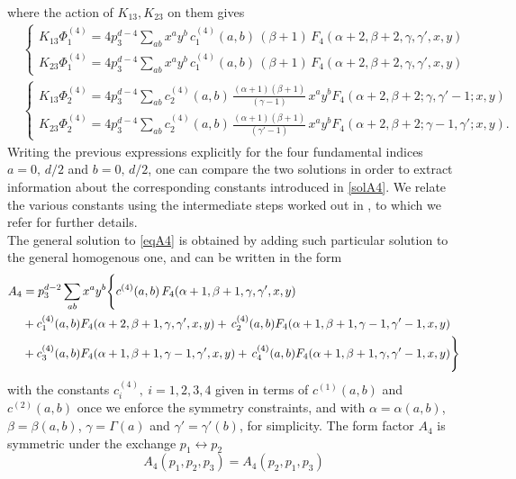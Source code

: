 \documentclass[a4paper,11pt,openright,twoside]{book}
\let\a=\alpha   \let\b=\beta   \let\g=\gamma   \let\d=\delta
\numberwithin{equation}{section}
\begin{document}
{{\begin{equation}
\begin{split}
\end{split}\label{solA4}
\end{equation}
where the action of $K_{13}, K_{23}$ on them gives
\begin{align}
&\left\{\begin{matrix}
	K_{13}\Phi_1^{(4)}=4p_3^{d-4}\sum_{a b} x^a y^b\, c_1^{(4)}(a,b)\,(\b+1)\,F_4(\alpha+2,\beta+2,\gamma,\gamma',x,y)\\[1.5ex]
	K_{23}\Phi_1^{(4)}=4p_3^{d-4}\sum_{a b} x^a y^b\, c_1^{(4)}(a,b)\,(\b+1)\,F_4(\alpha+2,\beta+2,\gamma,\gamma',x,y)
\end{matrix}\right.\\[2.2ex]
&\left\{\begin{matrix}
	K_{13}\Phi_2^{(4)}=4p_3^{d -4} \sum_{a b} c_2^{(4)}(a,b)\,\frac{(\a+1)(\b+1)}{(\g-1)} \,x^a y^b   F_4(\alpha+2,\beta+2; \gamma,\gamma'-1;x,y)\\[1.5ex]
	K_{23}\Phi_2^{(4)}=4p_3^{d -4} \sum_{a b} c_2^{(4)}(a,b)\,\frac{(\a+1)(\b+1)}{(\g'-1)} \,x^a y^b   F_4(\alpha+2,\beta+2; \gamma-1,\gamma';x,y).
\end{matrix}\right.
\end{align}
Writing the previous expressions explicitly for the four fundamental indices $a=0,\,d/2$ and $b=0,\,d/2$, one can compare the two solutions in order to extract information about the corresponding constants introduced in \eqref{solA4}.  
We relate the various constants using the intermediate steps worked out in \cite{Coriano:2018bbe, Coriano:2018bsy}, to which we refer for further details.\\ 
The general solution to \eqref{eqA4} is obtained by adding such particular solution to the general homogenous one, and can be written in the form
\begin{align}
A_4&=p_3^{d-2}\sum_{ab}x^ay^b\Bigg\{c^{(4)}(a,b)\,F_4(\a+1,\b+1,\g,\g',x,y)\notag\\
&+c^{(4)}_1(a,b)F_4(\a+2,\b+1,\g,\g',x,y)+\,c^{(4)}_2(a,b)F_4(\a+1,\b+1,\g-1,\g'-1,x,y)\notag\\
&+c^{(4)}_3(a,b)F_4(\a+1,\b+1,\g-1,\g',x,y)+\,c^{(4)}_4(a,b)F_4(\a+1,\b+1,\g,\g'-1,x,y)\Bigg\}
\end{align}
with the constants $c^{(4)}_i,\ i=1,2,3,4$ given in terms of $c^{(1)}(a,b)$ and $c^{(2)}(a,b)$ once we enforce the symmetry constraints, and with $\a=\a(a,b)$, $\b=\b(a,b)$, $\g=\Gamma(a)$ and $\g'=\g'(b)$, for simplicity.
The form factor $A_4$ is symmetric under the exchange $p_1\leftrightarrow p_2$
\begin{equation}
A_4(p_1,p_2,p_3)=A_4(p_2,p_1,p_3)

\end{equation}}}
\end{document}
